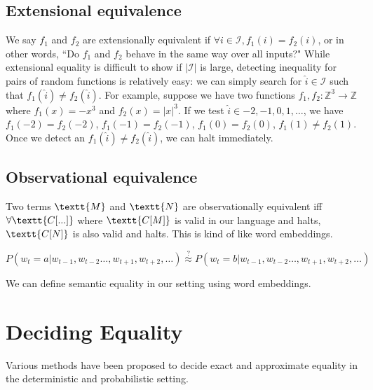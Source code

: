 \documentclass[11pt]{article}
\begin{document}
    \subsection{Extensional equivalence}\label{subsec:extensional-equivalence}

    We say $f_1$ and $f_2$ are extensionally equivalent if $\forall i \in \mathcal{I}, f_1(i)=f_2(i)$, or in other words, ``Do $f_1$ and $f_2$ behave in the same way over all inputs?" While extensional equality is difficult to show if $|\mathcal{I}|$ is large, detecting inequality for pairs of random functions is relatively easy: we can simply search for $\hat i \in \mathcal{I}$ such that $f_1(\hat i) \neq f_2(\hat i)$. For example, suppose we have two functions $f_1, f_2: \mathbb{Z}^3 \rightarrow \mathbb{Z}$ where $f_1(x)=-x^3$ and $f_2(x)=|x|^3$. If we test $\hat i \in {-2, -1, 0, 1, \ldots}$, we have $f_1(-2)=f_2(-2)$, $f_1(-1)=f_2(-1)$, $f_1(0)=f_2(0)$, $f_1(1) \neq f_2(1)$. Once we detect an $f_1(\hat i) \neq f_2(\hat i)$, we can halt immediately.

    \subsection{Observational equivalence}

    Two terms $\textt{M}$ and $\textt{N}$ are observationally equivalent iff $\forall \textt{C[...]}$ where $\textt{C[M]}$ is valid in our language and halts, $\textt{C[N]}$ is also valid and halts. This is kind of like word embeddings.

    $P(w_t = a | w_{t-1}, w_{t-2}\ldots, w_{t+1}, w_{t+2}, \ldots)\overset{?}{\approx} P(w_t = b | w_{t-1}, w_{t-2}\ldots, w_{t+1}, w_{t+2}, \ldots)$

    We can define semantic equality in our setting using word embeddings.

    \section{Deciding Equality}\label{sec:structural}

    Various methods have been proposed to decide exact and approximate equality in the deterministic and probabilistic setting.
\end{document}
